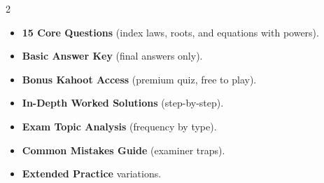 \documentclass[11pt,a4paper]{article}
\newcommand{\FullReleaseDate}{April 30, 2026}
\begin{document}
\vspace{8pt}

\begin{multicols}{2}
  \begin{tcolorbox}[card, title=\sffamily\bfseries\textcolor{white}{\faHandPointDown\ TODAY (Simplified Version)}, colbacktitle=mainblue, boxed title style={sharp corners, boxrule=0pt}]
    \begin{itemize}[leftmargin=1.2em, itemsep=2pt]
      \item \small \textbf{15 Core Questions} (index laws, roots, and equations with powers).
      \item \small \textbf{Basic Answer Key} (final answers only).
      \item \small \textbf{Bonus Kahoot Access} (premium quiz, free to play).
    \end{itemize}
  \end{tcolorbox}

  \columnbreak

  \begin{tcolorbox}[card, title=\sffamily\bfseries\textcolor{white}{\faRocket\ ON \FullReleaseDate\ (Full Upgrade)}, colbacktitle=mainblue, boxed title style={sharp corners, boxrule=0pt}]
    \begin{itemize}[leftmargin=1.2em, itemsep=2pt]
      \item \small \textbf{In-Depth Worked Solutions} (step-by-step).
      \item \small \textbf{Exam Topic Analysis} (frequency by type).
      \item \small \textbf{Common Mistakes Guide} (examiner traps).
      \item \small \textbf{Extended Practice} variations.
    \end{itemize}
  \end{tcolorbox}
\end{multicols}
\end{document}
